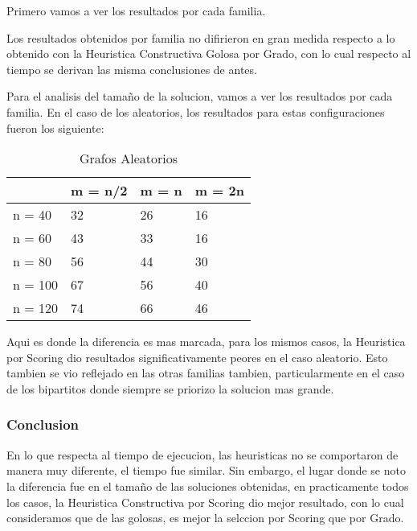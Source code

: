 \newpage
Primero vamos a ver los resultados por cada familia.

Los resultados obtenidos por familia no difirieron en gran medida respecto a lo obtenido con la Heuristica Constructiva Golosa por Grado, con lo cual respecto al tiempo se derivan las misma conclusiones de antes.

Para el analisis del tamaño de la solucion, vamos a ver los resultados por cada familia. En el caso de los aleatorios, los resultados para estas configuraciones fueron los siguiente:

\begin{table}[H]
\centering
\caption{Grafos Aleatorios}
\label{my-label}
\begin{tabular}{|l|lll|}
\hline
        & \multicolumn{1}{l|}{m = n/2} & \multicolumn{1}{l|}{m = n} & m = 2n \\ \hline
n = 40  & 32                           & 26                         & 16     \\ \cline{1-1}
n = 60  & 43                           & 33                         & 16     \\ \cline{1-1}
n = 80  & 56                           & 44                         & 30     \\ \cline{1-1}
n = 100 & 67                           & 56                         & 40     \\ \cline{1-1}
n = 120 & 74                           & 66                         & 46     \\ \hline
\end{tabular}
\end{table}

Aqui es donde la diferencia es mas marcada, para los mismos casos, la Heuristica por Scoring dio resultados significativamente peores en el caso aleatorio. Esto tambien se vio reflejado en las otras familias tambien, particularmente en el caso de los bipartitos donde siempre se priorizo la solucion mas grande.

\subsubsection{Conclusion}

En lo que respecta al tiempo de ejecucion, las heuristicas no se comportaron de manera muy diferente, el tiempo fue similar. Sin embargo, el lugar donde se noto la diferencia fue en el tamaño de las soluciones obtenidas, en practicamente todos los casos, la Heuristica Constructiva por Scoring dio mejor resultado, con lo cual consideramos que de las golosas, es mejor la selccion por Scoring que por Grado.